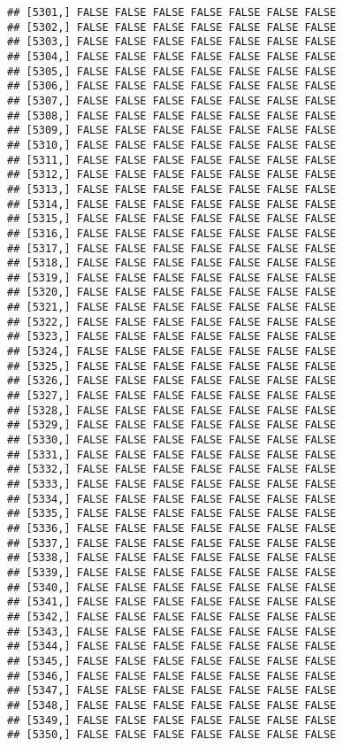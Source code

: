 \documentclass[
]{article}
\begin{document}
\begin{verbatim}
## [5301,] FALSE FALSE FALSE FALSE FALSE FALSE FALSE
## [5302,] FALSE FALSE FALSE FALSE FALSE FALSE FALSE
## [5303,] FALSE FALSE FALSE FALSE FALSE FALSE FALSE
## [5304,] FALSE FALSE FALSE FALSE FALSE FALSE FALSE
## [5305,] FALSE FALSE FALSE FALSE FALSE FALSE FALSE
## [5306,] FALSE FALSE FALSE FALSE FALSE FALSE FALSE
## [5307,] FALSE FALSE FALSE FALSE FALSE FALSE FALSE
## [5308,] FALSE FALSE FALSE FALSE FALSE FALSE FALSE
## [5309,] FALSE FALSE FALSE FALSE FALSE FALSE FALSE
## [5310,] FALSE FALSE FALSE FALSE FALSE FALSE FALSE
## [5311,] FALSE FALSE FALSE FALSE FALSE FALSE FALSE
## [5312,] FALSE FALSE FALSE FALSE FALSE FALSE FALSE
## [5313,] FALSE FALSE FALSE FALSE FALSE FALSE FALSE
## [5314,] FALSE FALSE FALSE FALSE FALSE FALSE FALSE
## [5315,] FALSE FALSE FALSE FALSE FALSE FALSE FALSE
## [5316,] FALSE FALSE FALSE FALSE FALSE FALSE FALSE
## [5317,] FALSE FALSE FALSE FALSE FALSE FALSE FALSE
## [5318,] FALSE FALSE FALSE FALSE FALSE FALSE FALSE
## [5319,] FALSE FALSE FALSE FALSE FALSE FALSE FALSE
## [5320,] FALSE FALSE FALSE FALSE FALSE FALSE FALSE
## [5321,] FALSE FALSE FALSE FALSE FALSE FALSE FALSE
## [5322,] FALSE FALSE FALSE FALSE FALSE FALSE FALSE
## [5323,] FALSE FALSE FALSE FALSE FALSE FALSE FALSE
## [5324,] FALSE FALSE FALSE FALSE FALSE FALSE FALSE
## [5325,] FALSE FALSE FALSE FALSE FALSE FALSE FALSE
## [5326,] FALSE FALSE FALSE FALSE FALSE FALSE FALSE
## [5327,] FALSE FALSE FALSE FALSE FALSE FALSE FALSE
## [5328,] FALSE FALSE FALSE FALSE FALSE FALSE FALSE
## [5329,] FALSE FALSE FALSE FALSE FALSE FALSE FALSE
## [5330,] FALSE FALSE FALSE FALSE FALSE FALSE FALSE
## [5331,] FALSE FALSE FALSE FALSE FALSE FALSE FALSE
## [5332,] FALSE FALSE FALSE FALSE FALSE FALSE FALSE
## [5333,] FALSE FALSE FALSE FALSE FALSE FALSE FALSE
## [5334,] FALSE FALSE FALSE FALSE FALSE FALSE FALSE
## [5335,] FALSE FALSE FALSE FALSE FALSE FALSE FALSE
## [5336,] FALSE FALSE FALSE FALSE FALSE FALSE FALSE
## [5337,] FALSE FALSE FALSE FALSE FALSE FALSE FALSE
## [5338,] FALSE FALSE FALSE FALSE FALSE FALSE FALSE
## [5339,] FALSE FALSE FALSE FALSE FALSE FALSE FALSE
## [5340,] FALSE FALSE FALSE FALSE FALSE FALSE FALSE
## [5341,] FALSE FALSE FALSE FALSE FALSE FALSE FALSE
## [5342,] FALSE FALSE FALSE FALSE FALSE FALSE FALSE
## [5343,] FALSE FALSE FALSE FALSE FALSE FALSE FALSE
## [5344,] FALSE FALSE FALSE FALSE FALSE FALSE FALSE
## [5345,] FALSE FALSE FALSE FALSE FALSE FALSE FALSE
## [5346,] FALSE FALSE FALSE FALSE FALSE FALSE FALSE
## [5347,] FALSE FALSE FALSE FALSE FALSE FALSE FALSE
## [5348,] FALSE FALSE FALSE FALSE FALSE FALSE FALSE
## [5349,] FALSE FALSE FALSE FALSE FALSE FALSE FALSE
## [5350,] FALSE FALSE FALSE FALSE FALSE FALSE FALSE

\end{verbatim}
\end{document}

